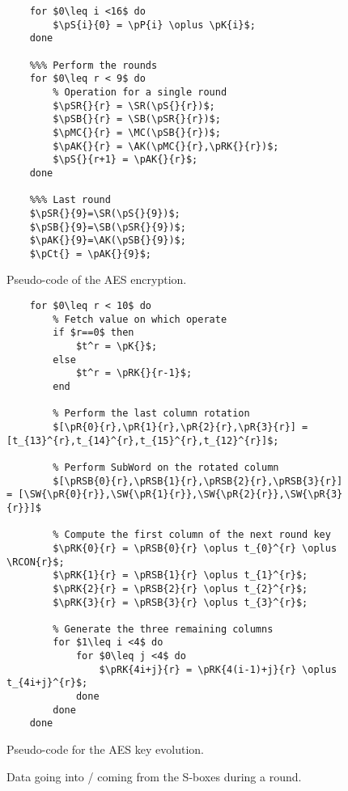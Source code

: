 \documentclass{scrartcl}
\begin{document}
\begin{figure}
    \begin{lstlisting}[frame=single]
    %%% First key addition
    for $0\leq i <16$ do
        $\pS{i}{0} = \pP{i} \oplus \pK{i}$;
    done
    
    %%% Perform the rounds
    for $0\leq r < 9$ do 
        % Operation for a single round
        $\pSR{}{r} = \SR(\pS{}{r})$;
        $\pSB{}{r} = \SB(\pSR{}{r})$;
        $\pMC{}{r} = \MC(\pSB{}{r})$;
        $\pAK{}{r} = \AK(\pMC{}{r},\pRK{}{r})$;
        $\pS{}{r+1} = \pAK{}{r}$;
    done
    
    %%% Last round
    $\pSR{}{9}=\SR(\pS{}{9})$;
    $\pSB{}{9}=\SB(\pSR{}{9})$;
    $\pAK{}{9}=\AK(\pSB{}{9})$;
    $\pCt{} = \pAK{}{9}$;
    \end{lstlisting}
    \caption{Pseudo-code of the AES encryption.}
    \label{fig:code_round}
\end{figure}


\begin{figure}
    \begin{lstlisting}[frame=single]
    %%% Key evolution for each round key 
    for $0\leq r < 10$ do
        % Fetch value on which operate
        if $r==0$ then
            $t^r = \pK{}$; 
        else 
            $t^r = \pRK{}{r-1}$;
        end

        % Perform the last column rotation
        $[\pR{0}{r},\pR{1}{r},\pR{2}{r},\pR{3}{r}] = [t_{13}^{r},t_{14}^{r},t_{15}^{r},t_{12}^{r}]$; 

        % Perform SubWord on the rotated column
        $[\pRSB{0}{r},\pRSB{1}{r},\pRSB{2}{r},\pRSB{3}{r}] = [\SW{\pR{0}{r}},\SW{\pR{1}{r}},\SW{\pR{2}{r}},\SW{\pR{3}{r}}]$

        % Compute the first column of the next round key
        $\pRK{0}{r} = \pRSB{0}{r} \oplus t_{0}^{r} \oplus \RCON{r}$;
        $\pRK{1}{r} = \pRSB{1}{r} \oplus t_{1}^{r}$;
        $\pRK{2}{r} = \pRSB{2}{r} \oplus t_{2}^{r}$;
        $\pRK{3}{r} = \pRSB{3}{r} \oplus t_{3}^{r}$;

        % Generate the three remaining columns
        for $1\leq i <4$ do
            for $0\leq j <4$ do
                $\pRK{4i+j}{r} = \pRK{4(i-1)+j}{r} \oplus t_{4i+j}^{r}$;
            done
        done
    done
    \end{lstlisting}
    \caption{Pseudo-code for the AES key evolution.}
    \label{fig:code_key}
\end{figure}

\begin{figure}
    \centering
    
    \caption{Data going into / coming from the S-boxes during a round.}
    \label{fig:pipe_sbox}
\end{figure}
\end{document}

